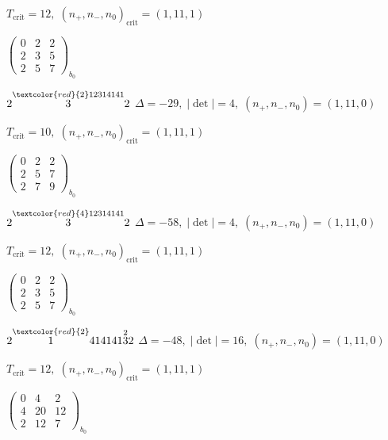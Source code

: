 \documentclass[10pt]{article}
\begin{document}
\hspace{1em}$T_{\text{crit}}=12,\; (n_+,n_-,n_0)_{\text{crit}}=(1,11,1)$

\hspace{2em}$\left(\begin{smallmatrix}0 & 2 & 2 \\ 2 & 3 & 5 \\ 2 & 5 & 7\end{smallmatrix}\right)_{\!b_0}$

$2\overset{\textcolor{red}{2}12314141}{3}2$ \quad $\Delta=-29,\; |\det|=4,\; (n_+,n_-,n_0)=(1,11,0)$

\hspace{1em}$T_{\text{crit}}=10,\; (n_+,n_-,n_0)_{\text{crit}}=(1,11,1)$

\hspace{2em}$\left(\begin{smallmatrix}0 & 2 & 2 \\ 2 & 5 & 7 \\ 2 & 7 & 9\end{smallmatrix}\right)_{\!b_0}$

$2\overset{\textcolor{red}{4}12314141}{3}2$ \quad $\Delta=-58,\; |\det|=4,\; (n_+,n_-,n_0)=(1,11,0)$

\hspace{1em}$T_{\text{crit}}=12,\; (n_+,n_-,n_0)_{\text{crit}}=(1,11,1)$

\hspace{2em}$\left(\begin{smallmatrix}0 & 2 & 2 \\ 2 & 3 & 5 \\ 2 & 5 & 7\end{smallmatrix}\right)_{\!b_0}$

\smallskip

$2\overset{\textcolor{red}{2}}{1}414141\overset{2}{3}2$ \quad $\Delta=-48,\; |\det|=16,\; (n_+,n_-,n_0)=(1,11,0)$

\hspace{1em}$T_{\text{crit}}=12,\; (n_+,n_-,n_0)_{\text{crit}}=(1,11,1)$

\hspace{2em}$\left(\begin{smallmatrix}0 & 4 & 2 \\ 4 & 20 & 12 \\ 2 & 12 & 7\end{smallmatrix}\right)_{\!b_0}$

\smallskip
\end{document}
